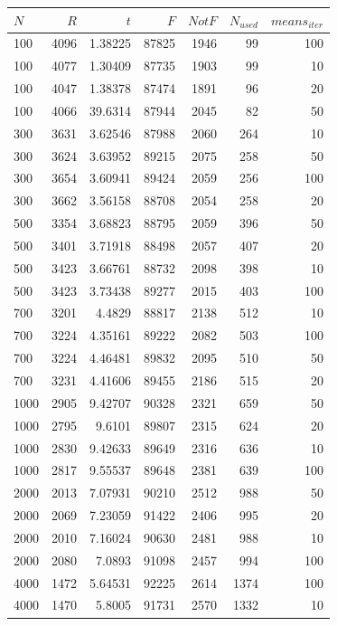 \begin{table}
\centering\footnotesize\sf
\begin{tabular}{lrrrrrr}
\toprule
$N$ & $R$ & $t$ & $F$ & $Not F$ & $N_{used}$ & $means_{iter}$ \\
\midrule
100 & 4096 & 1.38225 & 87825 & 1946 & 99 & 100 \\
100 & 4077 & 1.30409 & 87735 & 1903 & 99 & 10 \\
100 & 4047 & 1.38378 & 87474 & 1891 & 96 & 20 \\
100 & 4066 & 39.6314 & 87944 & 2045 & 82 & 50 \\
300 & 3631 & 3.62546 & 87988 & 2060 & 264 & 10 \\
300 & 3624 & 3.63952 & 89215 & 2075 & 258 & 50 \\
300 & 3654 & 3.60941 & 89424 & 2059 & 256 & 100 \\
300 & 3662 & 3.56158 & 88708 & 2054 & 258 & 20 \\
500 & 3354 & 3.68823 & 88795 & 2059 & 396 & 50 \\
500 & 3401 & 3.71918 & 88498 & 2057 & 407 & 20 \\
500 & 3423 & 3.66761 & 88732 & 2098 & 398 & 10 \\
500 & 3423 & 3.73438 & 89277 & 2015 & 403 & 100 \\
700 & 3201 & 4.4829 & 88817 & 2138 & 512 & 10 \\
700 & 3224 & 4.35161 & 89222 & 2082 & 503 & 100 \\
700 & 3224 & 4.46481 & 89832 & 2095 & 510 & 50 \\
700 & 3231 & 4.41606 & 89455 & 2186 & 515 & 20 \\
1000 & 2905 & 9.42707 & 90328 & 2321 & 659 & 50 \\
1000 & 2795 & 9.6101 & 89807 & 2315 & 624 & 20 \\
1000 & 2830 & 9.42633 & 89649 & 2316 & 636 & 10 \\
1000 & 2817 & 9.55537 & 89648 & 2381 & 639 & 100 \\
2000 & 2013 & 7.07931 & 90210 & 2512 & 988 & 50 \\
2000 & 2069 & 7.23059 & 91422 & 2406 & 995 & 20 \\
2000 & 2010 & 7.16024 & 90630 & 2481 & 988 & 10 \\
2000 & 2080 & 7.0893 & 91098 & 2457 & 994 & 100 \\
4000 & 1472 & 5.64531 & 92225 & 2614 & 1374 & 100 \\
4000 & 1470 & 5.8005 & 91731 & 2570 & 1332 & 10 \\

\end{tabular}
\end{table}
